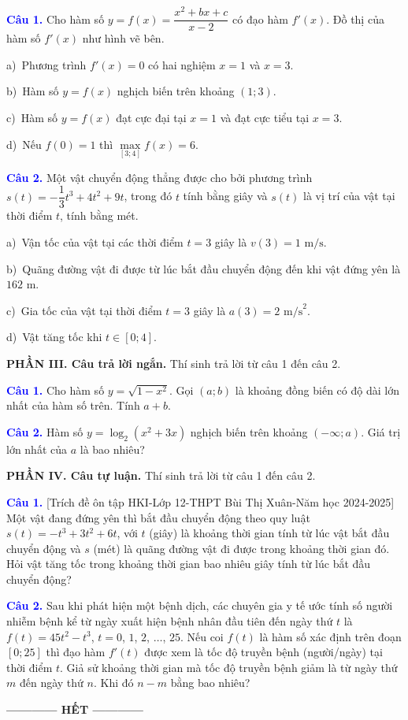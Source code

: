 \documentclass[12pt,a4paper]{article}
\begin{document}
\noindent\textcolor{blue}{\textbf{Câu 1.}} 
Cho hàm số $y=f(x)=\dfrac{x^2+bx+c}{x-2}$ có đạo hàm $f'(x)$. Đồ thị của hàm số $f'(x)$ như hình vẽ bên.

\noindent a)~Phương trình $f'(x)=0$ có hai nghiệm $x=1$ và $x=3$.

\noindent b)~Hàm số $y=f(x)$ nghịch biến trên khoảng $(1;3)$.

\noindent c)~Hàm số $y=f(x)$ đạt cực đại tại $x=1$ và đạt cực tiểu tại $x=3$.

\noindent d)~Nếu $f(0)=1$ thì $\max\limits_{[3;4]} f(x)=6$.

\noindent\textcolor{blue}{\textbf{Câu 2.}} Một vật chuyển động thẳng được cho bởi phương trình $s(t)=-\dfrac{1}{3}t^3+4t^2+9t$, trong đó $t$ tính bằng giây và $s(t)$ là vị trí của vật tại thời điểm $t$, tính bằng mét.

\noindent a)~Vận tốc của vật tại các thời điểm $t=3$ giây là $v(3)=1 \text{ m/s}$.

\noindent b)~Quãng đường vật đi được từ lúc bắt đầu chuyển động đến khi vật đứng yên là $162 \text{ m}$.

\noindent c)~Gia tốc của vật tại thời điểm $t=3$ giây là $a(3)=2 \text{ m/s}^2$.

\noindent d)~Vật tăng tốc khi $t \in[0; 4]$.

\noindent\textbf{PHẦN III. Câu trả lời ngắn.}
Thí sinh trả lời từ câu 1 đến câu 2.

\medskip

\noindent\textcolor{blue}{\textbf{Câu 1.}} Cho hàm số $y=\sqrt{1-x^2}$. Gọi $(a;b)$ là khoảng đồng biến có độ dài lớn nhất của hàm số trên. Tính $a+b$.

\noindent\textcolor{blue}{\textbf{Câu 2.}} Hàm số $y=\log_2(x^2+3x)$ nghịch biến trên khoảng $(-\infty; a)$. Giá trị lớn nhất của $a$ là bao nhiêu?
	\par

\noindent\textbf{PHẦN IV. Câu tự luận.}
Thí sinh trả lời từ câu 1 đến câu 2.

\medskip

\noindent\textcolor{blue}{\textbf{Câu 1.}} [Trích đề ôn tập HKI-Lớp 12-THPT Bùi Thị Xuân-Năm học 2024-2025]
	Một vật đang đứng yên thì bắt đầu chuyển động theo quy luật $s(t)=-t^3+3t^2+6t$, với $t$ (giây) là khoảng thời gian tính từ lúc vật bắt đầu chuyển động và $s$ (mét) là quãng đường vật đi được trong khoảng thời gian đó. Hỏi vật tăng tốc trong khoảng thời gian bao nhiêu giây tính từ lúc bắt đầu chuyển động?

\noindent\textcolor{blue}{\textbf{Câu 2.}} Sau khi phát hiện một bệnh dịch, các chuyên gia y tế ước tính số người nhiễm bệnh kể từ ngày xuất hiện bệnh nhân đầu tiên đến ngày thứ $t$ là $f(t)=45t^2-t^3$, $t=0$, $1$, $2$, $\ldots$, $25$. Nếu coi $f(t)$ là hàm số xác định trên đoạn $[0; 25]$ thì đạo hàm $f'(t)$ được xem là tốc độ truyền bệnh (người/ngày) tại thời điểm $t$. Giả sử khoảng thời gian mà tốc độ truyền bệnh giảm là từ ngày thứ $m$ đến ngày thứ $n$. Khi đó $n-m$ bằng bao nhiêu?


\textbf{------------ HẾT ------------}
\label{lastpage}
\end{document}
